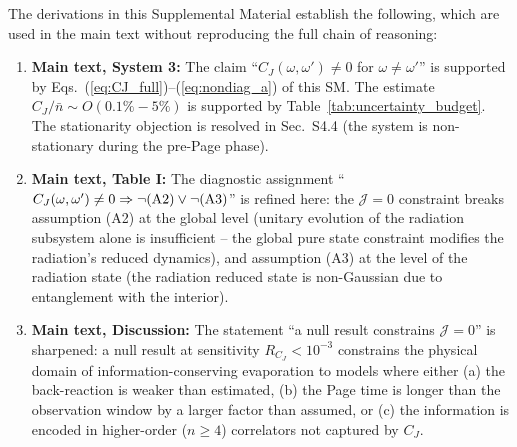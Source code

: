 \documentclass[prd,aps,showpacs,superscriptaddress,twocolumn]{revtex4-2}
\begin{document}
The derivations in this Supplemental Material establish the following, which are used in the main text without reproducing the full chain of reasoning:

\begin{enumerate}
    \item \textbf{Main text, System 3:} The claim ``$C_J(\omega,\omega') \neq 0$ for $\omega \neq \omega'$'' is supported by Eqs.~(\ref{eq:CJ_full})--(\ref{eq:nondiag_a}) of this SM. The estimate $C_J/\bar{n} \sim O(0.1\%-5\%)$ is supported by Table~\ref{tab:uncertainty_budget}. The stationarity objection is resolved in Sec.~S4.4 (the system is non-stationary during the pre-Page phase).

    \item \textbf{Main text, Table I:} The diagnostic assignment ``$C_J(\omega,\omega') \neq 0 \Rightarrow \neg({\rm A2}) \vee \neg({\rm A3})$'' is refined here: the $\mathcal{J}=0$ constraint breaks assumption (A2) at the global level (unitary evolution of the radiation subsystem alone is insufficient -- the global pure state constraint modifies the radiation's reduced dynamics), and assumption (A3) at the level of the radiation state (the radiation reduced state is non-Gaussian due to entanglement with the interior).

    \item \textbf{Main text, Discussion:} The statement ``a null result constrains $\mathcal{J}=0$'' is sharpened: a null result at sensitivity $R_{C_J} < 10^{-3}$ constrains the physical domain of information-conserving evaporation to models where either (a) the back-reaction is weaker than estimated, (b) the Page time is longer than the observation window by a larger factor than assumed, or (c) the information is encoded in higher-order ($n \geq 4$) correlators not captured by $C_J$.
\end{enumerate}
\end{document}

